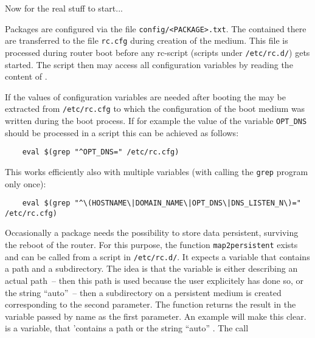     Now for the real stuff to start...





    Packages are configured via the file \texttt{config/<PACKAGE>.txt}.
    The  contained there are
    transferred to the file \texttt{rc.cfg} during creation of the medium.
    This file is processed during router boot before any rc-script
    (scripts under \texttt{/etc/rc.d/}) gets started. The script then
    may access all configuration variables by reading the content of
    .

    If the values of configuration variables are needed after booting
    the may be extracted from \texttt{/etc/rc.cfg} to which the configuration
    of the boot medium was written during the boot process. If for example
    the value of the variable \texttt{OPT\_DNS} should be processed in a script
    this can be achieved as follows:

\begin{example}
\begin{verbatim}
    eval $(grep "^OPT_DNS=" /etc/rc.cfg)
\end{verbatim}
\end{example}

    This works efficiently also with multiple variables (with calling
    the \texttt{grep} program only once):

\begin{example}
\begin{verbatim}
    eval $(grep "^\(HOSTNAME\|DOMAIN_NAME\|OPT_DNS\|DNS_LISTEN_N\)=" /etc/rc.cfg)
\end{verbatim}
\end{example}


Occasionally a package needs the possibility to store data persistent,
surviving the reboot of the router. For this purpose, the function
\texttt{map2persistent} exists and can be called from a script in
\texttt{/etc/rc.d/}. It expects a variable that contains a path
and a subdirectory. The idea is that the variable is either describing
an actual path~-- then this path is used because the user explicitely
has done so, or the string ``auto''~-- then a subdirectory on a persistent
medium is created corresponding to the second parameter. The function returns
the result in the variable passed by name as the first parameter.
An example will make this clear.  is a variable,
that 'contains a path or the string ``auto'' . The call

